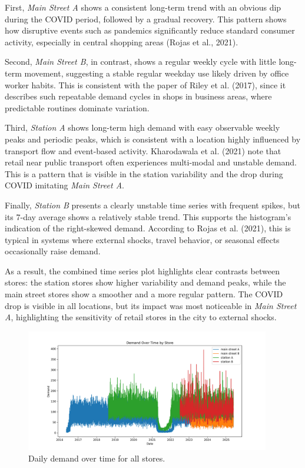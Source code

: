 First, \emph{Main Street A} shows a consistent long-term trend with an obvious dip during the COVID period, followed by a gradual recovery. This pattern shows how disruptive events such as pandemics significantly reduce standard consumer activity, especially in central shopping areas (Rojas et al., 2021).

Second, \emph{Main Street B}, in contrast, shows a regular weekly cycle with little long-term movement, suggesting a stable regular weekday use likely driven by office worker habits. This is consistent with the paper of Riley et al. (2017), since it describes such repeatable demand cycles in shops in business areas, where predictable routines dominate variation.

Third, \emph{Station A} shows long-term high demand with easy observable weekly peaks and periodic peaks, which is consistent with a location highly influenced by transport flow and event-based activity. Kharodawala et al. (2021) note that retail near public transport often experiences multi-modal and unstable demand. This is a pattern that is visible in the station variability and the drop during COVID imitating \emph{Main Street A}.

Finally, \emph{Station B} presents a clearly unstable time series with frequent spikes, but its 7-day average shows a relatively stable trend. This supports the histogram's indication of the right-skewed demand. According to Rojas et al. (2021), this is typical in systems where external shocks, travel behavior, or seasonal effects occasionally raise demand.

As a result, the combined time series plot highlights clear contrasts between stores: the station stores show higher variability and demand peaks, while the main street stores show a smoother and a more regular pattern. The COVID drop is visible in all locations, but its impact was most noticeable in \emph{Main Street A}, highlighting the sensitivity of retail stores in the city to external shocks.




\begin{figure}[H]
    \centering
    \includegraphics[width=0.95\textwidth]{figures/time_series_all_stores.png}
    \caption{Daily demand over time for all stores.}
    \label{fig:all_timeseries}
\end{figure}

